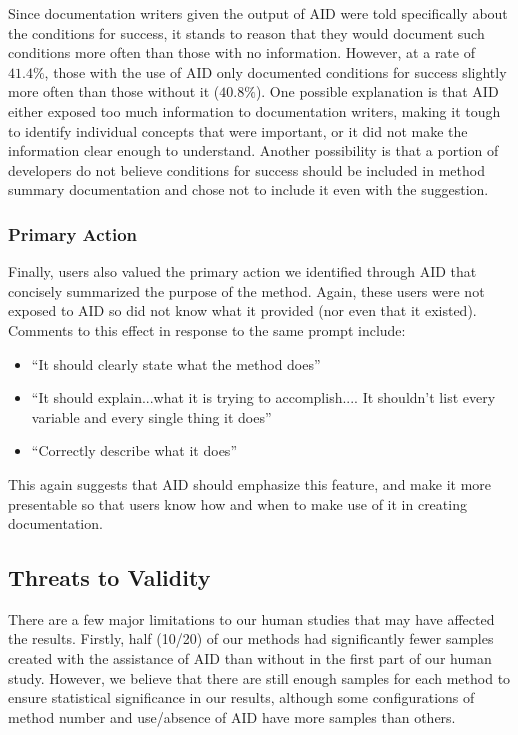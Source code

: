 \documentclass[preprint]{sigplanconf}
\begin{document}
Since documentation writers given the output of AID were told specifically about the conditions for success, it stands to reason that they would document such conditions more often than those with no information. However, at a rate of \(41.4\%\), those with the use of AID only documented conditions for success slightly more often than those without it (\(40.8\%\)). One possible explanation is that AID either exposed too much information to documentation writers, making it tough to identify individual concepts that were important, or it did not make the information clear enough to understand. Another possibility is that a portion of developers do not believe conditions for success should be included in method summary documentation and chose not to include it even with the suggestion.

\subsubsection{Primary Action}

Finally, users also valued the primary action we identified through AID that concisely summarized the purpose of the method. Again, these users were not exposed to AID so did not know what it provided (nor even that it existed). Comments to this effect in response to the same prompt include:

\begin{itemize}
\item ``It should clearly state what the method does''
\item ``It should explain...what it is trying to accomplish.... It shouldn't list every variable and every single thing it does''
\item ``Correctly describe what it does''
\end{itemize}

This again suggests that AID should emphasize this feature, and make it more presentable so that users know how and when to make use of it in creating documentation.

\subsection{Threats to Validity}
There are a few major limitations to our human studies that may have affected the results. Firstly, half (10/20) of our methods had significantly fewer samples created with the assistance of AID than without in the first part of our human study. However, we believe that there are still enough samples for each method to ensure statistical significance in our results, although some configurations of method number and use/absence of AID have more samples than others.
\end{document}
